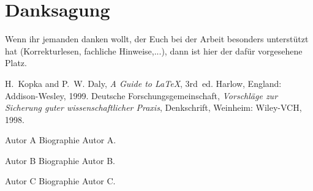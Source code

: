 \documentclass[journal,final,a4paper,twoside]{PS}
\begin{document}
\section*{Danksagung}
Wenn ihr jemanden danken wollt, der Euch bei der Arbeit besonders
unterstützt hat (Korrekturlesen, fachliche Hinweise,...), dann ist hier der dafür vorgesehene Platz.

\begin{thebibliography}{1}
H.~Kopka and P.~W. Daly, \emph{A Guide to {\LaTeX}}, 3rd~ed. Harlow, England: Addison-Wesley, 1999.
Deutsche Forschungsgemeinschaft, \emph{Vorschläge zur Sicherung guter wissenschaftlicher Praxis}, Denkschrift, Weinheim: Wiley-VCH, 1998.
\end{thebibliography}

\begin{biography}
{Autor A}
Biographie Autor A.
\end{biography}
\begin{biography}
{Autor B}
Biographie Autor B.
\end{biography}
\begin{biography}
{Autor C}
Biographie Autor C.
\end{biography}
\end{document}
